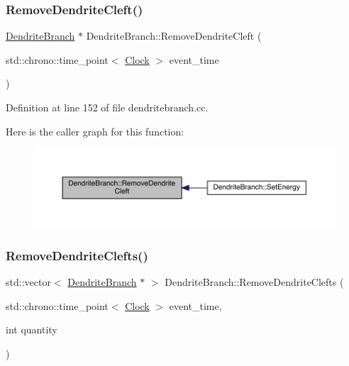 \subsubsection{\texorpdfstring{Remove\+Dendrite\+Cleft()}{RemoveDendriteCleft()}}
{\footnotesize\ttfamily \hyperlink{class_dendrite_branch}{Dendrite\+Branch} $\ast$ Dendrite\+Branch\+::\+Remove\+Dendrite\+Cleft (\begin{DoxyParamCaption}\item[{std\+::chrono\+::time\+\_\+point$<$ \hyperlink{universe_8h_a0ef8d951d1ca5ab3cfaf7ab4c7a6fd80}{Clock} $>$}]{event\+\_\+time }\end{DoxyParamCaption})}



Definition at line 152 of file dendritebranch.\+cc.

Here is the caller graph for this function\+:
\nopagebreak
\begin{figure}[H]
\begin{center}
\leavevmode
\includegraphics[width=350pt]{class_dendrite_branch_afaca221cb4bba98e56f11b0f9e6370b5_icgraph}
\end{center}
\end{figure}
\mbox{\label{class_dendrite_branch_acd54003e5acb9abda7d7a42f248c14b0}} 
\subsubsection{\texorpdfstring{Remove\+Dendrite\+Clefts()}{RemoveDendriteClefts()}}
{\footnotesize\ttfamily std\+::vector$<$ \hyperlink{class_dendrite_branch}{Dendrite\+Branch} $\ast$ $>$ Dendrite\+Branch\+::\+Remove\+Dendrite\+Clefts (\begin{DoxyParamCaption}\item[{std\+::chrono\+::time\+\_\+point$<$ \hyperlink{universe_8h_a0ef8d951d1ca5ab3cfaf7ab4c7a6fd80}{Clock} $>$}]{event\+\_\+time,  }\item[{int}]{quantity }\end{DoxyParamCaption})}



